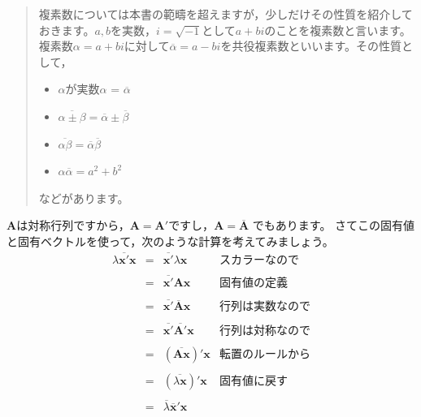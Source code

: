 \documentclass{ltjsbook}
\begin{document}
\begin{quotation}
	複素数については本書の範疇を超えますが，少しだけその性質を紹介しておきます。$a,b$を実数，$i=\sqrt{-1}$として$a+bi$のことを複素数と言います。複素数$\alpha = a+bi$に対して$\overline{\alpha}=a-bi$を共役複素数といいます。その性質として，
	\begin{itemize}
		\item $\alpha$が実数\Leftrightarrow $\alpha$ = $\overline{\alpha}$
		\item $\overline{\alpha \pm \beta} = \overline{\alpha}\pm \overline{\beta}$
		\item $\overline{\alpha\beta} = \overline{\alpha}\overline{\beta}$
		\item $\alpha\overline{\alpha} = a^2+b^2$
	\end{itemize}
	などがあります。
\end{quotation}
$\bm{A}$は対称行列ですから，$\bm{A}=\bm{A}'$ですし，$\bm{A} = \overline{\bm{A}}$ でもあります。
さてこの固有値と固有ベクトルを使って，次のような計算を考えてみましょう。
\[
	\begin{array}{lllr}
		\lambda \overline{\bm{x}'}\bm{x} & = & \overline{\bm{x}'}\lambda \bm{x}           & \mbox{スカラーなので}  \\
		                                 &   &                                            &                 \\
		                                 & = & \overline{\bm{x}'}\bm{Ax}                  & \mbox{固有値の定義}   \\ & & &\\
		                                 & = & \overline{\bm{x}'}\overline{\bm{A}}\bm{x}  & \mbox{行列は実数なので} \\ & & &\\
		                                 & = & \overline{\bm{x}'}\overline{\bm{A}'}\bm{x} & \mbox{行列は対称なので} \\ & & &\\
		                                 & = & (\overline{\bm{Ax}})'\bm{x}                & \mbox{転置のルールから} \\ & & &\\
		                                 & = & (\overline{\lambda\bm{x}})'\bm{x}          & \mbox{固有値に戻す}   \\ & & &\\
		                                 & = & \overline{\lambda}\overline{\bm{x}}'\bm{x}                   \\
	\end{array}
\]
\end{document}
